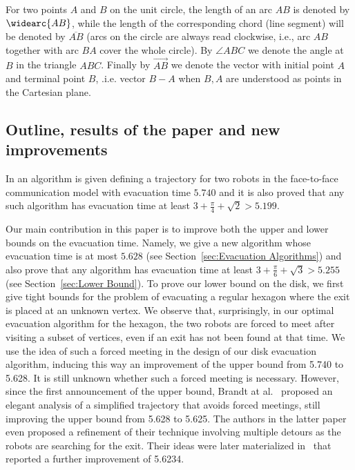 \documentclass[
final
]{dmtcs-episciences}
\newcommand{\vect}[1]{\overrightarrow{#1}}
\newcommand{\ff}{face-to-face }
\newcommand{\arccc}[1]{
\widearc{#1}
}
\theoremstyle{definition}
\begin{document}
For two points $A$ and $B$ on the unit circle, the length of an arc $AB$ is denoted by $\arccc{AB}$, 
while the length of the corresponding chord (line segment) will be denoted by $\overline{AB}$ 
(arcs on the circle are always read clockwise, i.e., arc $AB$ together with arc $BA$ cover the whole circle). 
By $\angle{ABC}$ we denote the angle at $B$ in the triangle $ABC$. Finally by $\vect{AB}$ we denote the vector with initial point $A$ and terminal point $B$, .i.e. vector $B-A$ when $B,A$ are understood as points in the Cartesian plane. 












\subsection{Outline, results of the paper and new improvements}

In \cite{CGGKMP} an algorithm is given defining a
trajectory for two robots in the \ff communication
model with evacuation time
$5.740$ and it is also proved that any such algorithm has evacuation 
time at least $3+ \frac{\pi}{4} + \sqrt{2} >  5.199$.

Our main contribution in this paper is to improve both the upper and lower bounds
on the evacuation time. Namely,
we give a new algorithm whose evacuation time is at most $5.628$
(see Section~\ref{sec:Evacuation Algorithms})
and also prove that any algorithm has evacuation 
time at least $3+ \frac{\pi}{6} + \sqrt{3} > 5.255$
(see Section~\ref{sec:Lower Bound}).
To prove our lower bound on the disk, we first give tight bounds for the problem of evacuating a regular hexagon where the exit is placed at an unknown vertex. 
We observe that, surprisingly, in our optimal evacuation algorithm for the hexagon, the two robots are forced to meet after visiting a subset of vertices, even if an exit has not been found at that time. 
We use the idea of such a forced meeting in the design of our disk evacuation algorithm, inducing this way an improvement of the upper bound from 5.740 to 5.628. 
It is still unknown  whether such a forced meeting is necessary. However, since the first announcement of the upper bound, Brandt at al.~\cite{Watten2017} proposed an elegant analysis of a simplified trajectory that avoids forced meetings, still improving the upper bound from 5.628 to 5.625. The authors in the latter paper even proposed a refinement of their technique involving multiple detours as the robots are searching for the exit. Their ideas were later materialized in~\cite{disser2019evacuating} that reported a further improvement of 5.6234.
\end{document}
